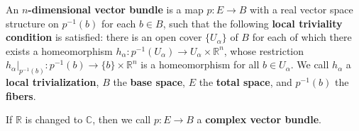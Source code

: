 \begin{defn} An \textbf{$n$-dimensional vector bundle} is a map $p:E\rightarrow B$ with a real vector space structure on $p^{-1}(b)$ for each $b\in B$, such that the following \textbf{local triviality condition} is satisfied: there is an open cover $\{U_\alpha\}$ of $B$ for each of which there exists a homeomorphism $h_\alpha:p^{-1}(U_\alpha)\rightarrow U_\alpha \times \mathbb{R}^n$, whose restriction $h_\alpha|_{p^{-1}(b)}:p^{-1}(b)\rightarrow \{b\}\times \mathbb{R}^n$ is a homeomorphism for all $b\in U_\alpha$. We call $h_\alpha$ a \textbf{local trivialization}, $B$ the \textbf{base space}, $E$ the \textbf{total space}, and $p^{-1}(b)$ the \textbf{fibers}.

If $\mathbb{R}$ is changed to $\mathbb{C}$, then we call $p:E\rightarrow B$ a \textbf{complex vector bundle}.
\end{defn}

